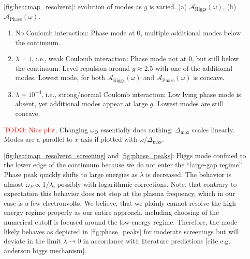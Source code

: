 \documentclass[
    reprint, 
    aps,
    preprintnumbers,
    twocolumn,
    prb,
    superscriptaddress
]{revtex4-2}
\newcommand{\debye}{\omega_\mathrm{D}}
\newcommand{\maxGap}{\Delta_\mathrm{max}}
\newcommand{\spectral}[1]{\mathcal{A}_\mathrm{#1}  (\omega)}
\begin{document}
\textbullet \autoref{fig:heatmap_resolvent}: evolution of modes as $g$ is varied. (a) $\spectral{Higgs}$, (b) $\spectral{Phase}$.
\begin{enumerate}
  \item No Coulomb interaction: Phase mode at 0, multiple additional modes below the continuum.
  \item $\lambda=1$, i.e., weak Coulomb interaction: Phase mode not at $0$, but still below the continuum.
  Level repulsion around $g\approx 2.5$ with one of the additional modes. Lowest mode, for both $\spectral{Higgs}$ and $\spectral{Phase}$ is concave.
  \item $\lambda=10^{-4}$, i.e., strong/normal Coulomb interaction: Low lying phase mode is absent, yet additional modes appear at large $g$.
  Lowest modes are still concave.
\end{enumerate}

\textbullet \textcolor{red}{TODO: Nice plot.} Changing $\debye$ essentially does nothing; $\maxGap$ scales linearly. Modes are a parallel to $x$-axis if plotted with $\omega / \maxGap$.

\textbullet \autoref{fig:heatmap_resolvent_screening} and \autoref{fig:phase_peaks}: Higgs mode confined to the lower edge of the continuum because we do not enter the ``large-gap regime''.
Phase peak quickly shifts to large energies as $\lambda$ is decreased. The behavior is almost $\omega_P \propto 1/\lambda$, possibly with logarithmic corrections.
Note, that contrary to expectation this behavior does not stop at the plasma frequency, which in our case is a few electronvolts.
We believe, that we plainly cannot resolve the high energy regime properly as our entire approach, including choosing of the numerical cutoff is focused around the low-energy regime.
Therefore, the mode likely behaves as depicted in \autoref{fig:phase_peaks} for moderate screenings but will deviate in the limit $\lambda \to 0$ in accordance with literature predictions [cite e.g. anderson higgs mechanism].

\end{document}
